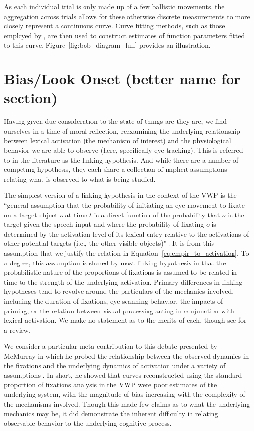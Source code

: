 As each individual trial is only made up of a few ballistic movements, the aggregation across trials allows for these otherwise discrete measurements to more closely represent a continuous curve. Curve fitting methods, such as those employed by , are then used to construct estimates of function parameters fitted to this curve. Figure~\ref{fig:bob_diagram_full} provides an illustration.

\section{Bias/Look Onset (better name for section)} 


Having given due consideration to the state of things are they are, we find ourselves in a time of moral reflection, reexamining the underlying relationship between lexical activation (the mechanism of interest) and the physiological behavior we are able to observe (here, specifically eye-tracking). This is referred to in the literature as the linking hypothesis. And while there are a number of competing hypothesis, they each share a collection of implicit assumptions relating what is observed to what is being studied.

The simplest version of a linking hypothesis in the context of the VWP is the ``general assumption that the probability of initiating an eye movement to fixate on a target object $o$ at time $t$ is a direct function of the probability that $o$ is the target given the speech input and where the probability of fixating $o$ is determined by the activation level of its lexical entry relative to the activations of other potential targets (i.e., the other visible objects)" \cite{allopenna1998tracking}. It is from this assumption that we justify the relation in Equation~\ref{eq:empir_to_activation}. To a degree, this assumption is shared by most linking hypothesis in that the probabilistic nature of the proportions of fixations is assumed to be related in time to the strength of the underlying activation. Primary differences in linking hypotheses tend to revolve around the particulars of the mechanics involved, including the duration of fixations, eye scanning behavior, the impacts of priming, or the relation between visual  processing acting in conjunction with lexical activation. We make no statement as to the merits of each, though see \cite{Magnuson2019} for a review.

We consider a particular meta contribution to this debate presented by McMurray in which he probed the relationship between the observed dynamics in the fixations and the underlying dynamics of activation under a variety of assumptions \cite{mcmurray2022m}. In short, he showed that curves reconstructed using the standard proportion of fixations analysis in the VWP were poor estimates of the underlying system, with the magnitude of bias increasing with the complexity of the mechanisms involved. Though this made few claims as to what the underlying mechanics may be, it did demonstrate the inherent difficulty in relating observable behavior to the underlying cognitive process.

